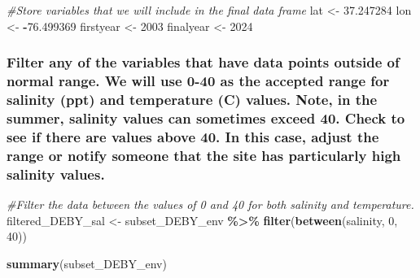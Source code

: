 \documentclass[
]{article}
\newenvironment{Shaded}{\begin{snugshade}}{\end{snugshade}}
\newcommand{\CommentTok}[1]{\textcolor[rgb]{0.56,0.35,0.01}{\textit{#1}}}
\newcommand{\DecValTok}[1]{\textcolor[rgb]{0.00,0.00,0.81}{#1}}
\newcommand{\FloatTok}[1]{\textcolor[rgb]{0.00,0.00,0.81}{#1}}
\newcommand{\FunctionTok}[1]{\textcolor[rgb]{0.13,0.29,0.53}{\textbf{#1}}}
\newcommand{\NormalTok}[1]{#1}
\newcommand{\OtherTok}[1]{\textcolor[rgb]{0.56,0.35,0.01}{#1}}
\newcommand{\SpecialCharTok}[1]{\textcolor[rgb]{0.81,0.36,0.00}{\textbf{#1}}}
\begin{document}
\begin{Shaded}
\begin{Highlighting}[]
\CommentTok{\#Store variables that we will include in the final data frame}
\NormalTok{lat }\OtherTok{\textless{}{-}} \FloatTok{37.247284}
\NormalTok{lon }\OtherTok{\textless{}{-}} \SpecialCharTok{{-}}\FloatTok{76.499369}
\NormalTok{firstyear }\OtherTok{\textless{}{-}} \DecValTok{2003}
\NormalTok{finalyear }\OtherTok{\textless{}{-}} \DecValTok{2024}
\end{Highlighting}
\end{Shaded}

\hypertarget{filter-any-of-the-variables-that-have-data-points-outside-of-normal-range.-we-will-use-0-40-as-the-accepted-range-for-salinity-ppt-and-temperature-c-values.-note-in-the-summer-salinity-values-can-sometimes-exceed-40.-check-to-see-if-there-are-values-above-40.-in-this-case-adjust-the-range-or-notify-someone-that-the-site-has-particularly-high-salinity-values.}{%
\subsubsection{Filter any of the variables that have data points outside
of normal range. We will use 0-40 as the accepted range for salinity
(ppt) and temperature (C) values. Note, in the summer, salinity values
can sometimes exceed 40. Check to see if there are values above 40. In
this case, adjust the range or notify someone that the site has
particularly high salinity
values.}\label{filter-any-of-the-variables-that-have-data-points-outside-of-normal-range.-we-will-use-0-40-as-the-accepted-range-for-salinity-ppt-and-temperature-c-values.-note-in-the-summer-salinity-values-can-sometimes-exceed-40.-check-to-see-if-there-are-values-above-40.-in-this-case-adjust-the-range-or-notify-someone-that-the-site-has-particularly-high-salinity-values.}}

\begin{Shaded}
\begin{Highlighting}[]
\CommentTok{\#Filter the data between the values of 0 and 40 for both salinity and temperature. }
\NormalTok{filtered\_DEBY\_sal }\OtherTok{\textless{}{-}}\NormalTok{ subset\_DEBY\_env }\SpecialCharTok{\%\textgreater{}\%}
    \FunctionTok{filter}\NormalTok{(}\FunctionTok{between}\NormalTok{(salinity, }\DecValTok{0}\NormalTok{, }\DecValTok{40}\NormalTok{)) }

\FunctionTok{summary}\NormalTok{(subset\_DEBY\_env)}
\end{Highlighting}
\end{Shaded}
\end{document}
